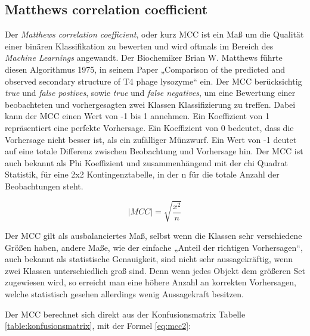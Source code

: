 \subsection{Matthews correlation coefficient}
\label{sec:mcc}
Der \emph{Matthews correlation coefficient}, oder kurz MCC ist ein Maß um die Qualität einer binären Klassifikation zu bewerten und wird oftmals im Bereich des \emph{Machine Learnings} angewandt. Der Biochemiker Brian W. Matthews führte diesen Algorithmus 1975, in seinem Paper „Comparison of the predicted and observed secondary structure of T4 phage lysozyme“ \cite{Matthews.1975} ein. Der MCC berücksichtig \emph{true} und \emph{false postives}, sowie \emph{true} und \emph{false negatives}, um eine Bewertung einer beobachteten und vorhergesagten zwei Klassen Klassifizierung zu treffen. Dabei kann der MCC einen Wert von -1 bis 1 annehmen. Ein Koeffizient von 1 repräsentiert eine perfekte Vorhersage. Ein Koeffizient von 0 bedeutet, dass die Vorhersage nicht besser ist, als ein zufälliger Münzwurf. Ein Wert von -1 deutet auf eine totale Differenz zwischen Beobachtung und Vorhersage hin. Der MCC ist auch bekannt als Phi Koeffizient und zusammenhängend mit der chi Quadrat Statistik, für eine 2x2 Kontingenztabelle, in der n für die totale Anzahl der Beobachtungen steht.

\begin{equation}
    |MCC| = \sqrt{\frac{x^2}{n}}
    \label{eq:mcc}
\end{equation}

Der MCC gilt als ausbalanciertes Maß, selbst wenn die Klassen sehr verschiedene Größen haben, andere Maße, wie der einfache „Anteil der richtigen Vorhersagen“, auch bekannt als statistische Genauigkeit, sind nicht sehr aussagekräftig, wenn zwei Klassen unterschiedlich groß sind. Denn wenn jedes Objekt dem größeren Set zugewiesen wird, so erreicht man eine höhere Anzahl an korrekten Vorhersagen, welche statistisch gesehen allerdings wenig Aussagekraft besitzen.

Der MCC berechnet sich direkt aus der Konfusionsmatrix Tabelle \ref{table:konfusionsmatrix}, mit der Formel \ref{eq:mcc2}:

\begin{table}[H]
    \centering
    \caption{Dargestellt ist die Konfusionsmatrix. tp = \emph{true positives}, fp = \emph{false postives}, tn \emph{true negatives} und fn = \emph{false negatives}.}
    \label{table:konfusionsmatrix}
\end{table}

